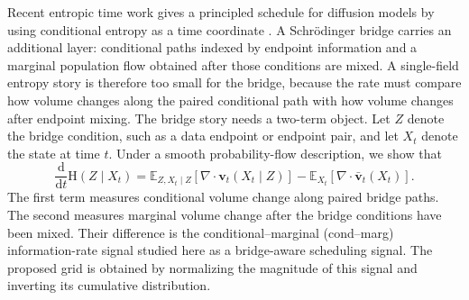 \documentclass{article}
\newcommand{\E}{\mathbb{E}}
\newcommand{\Ent}{\mathrm{H}}
\newcommand{\dd}{\mathrm{d}}
\newcommand{\vv}{\bm{v}}
\newcommand{\diver}{\nabla\!\cdot}
\theoremstyle{plain}
\theoremstyle{definition}
\theoremstyle{remark}
\begin{document}
Recent entropic time work gives a principled schedule for diffusion models by using conditional entropy as a time coordinate \citep{stancevic2025entropic,stancevic2026information}. A Schr\"odinger bridge carries an additional layer: conditional paths indexed by endpoint information and a marginal population flow obtained after those conditions are mixed. A single-field entropy story is therefore too small for the bridge, because the rate must compare how volume changes along the paired conditional path with how volume changes after endpoint mixing. The bridge story needs a two-term object. Let $Z$ denote the bridge condition, such as a data endpoint or endpoint pair, and let $X_t$ denote the state at time $t$. Under a smooth probability-flow description, we show that
\begin{equation}
  \frac{\dd}{\dd t}\Ent(Z\mid X_t)
  =
  \E_{Z,X_t\mid Z}\!\left[\diver \vv_t(X_t\mid Z)\right]
  -
  \E_{X_t}\!\left[\diver \bar{\vv}_t(X_t)\right].
  \label{eq:intro_identity}
\end{equation}
The first term measures conditional volume change along paired bridge paths. The second measures marginal volume change after the bridge conditions have been mixed. Their difference is the conditional--marginal (cond--marg) information-rate signal studied here as a bridge-aware scheduling signal. The proposed grid is obtained by normalizing the magnitude of this signal and inverting its cumulative distribution.
\end{document}
